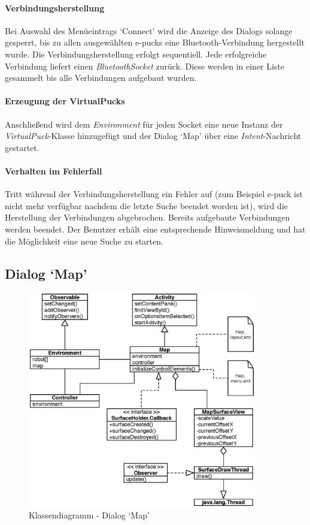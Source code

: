 \documentclass[10pt,a4paper]{article}
\begin{document}
	\paragraph*{Verbindungsherstellung}
	Bei Auswahl des Menüeintrags `Connect' wird die Anzeige des Dialogs solange gesperrt, bis zu allen ausgewählten e-pucks eine Bluetooth-Verbindung
	hergestellt wurde. Die Verbindungsherstellung erfolgt sequentiell. Jede erfolgreiche Verbindung liefert einen \textit{BluetoothSocket} zurück.
	Diese werden in einer Liste gesammelt bis alle Verbindungen aufgebaut wurden.
	
	\paragraph*{Erzeugung der VirtualPucks}
	Anschließend wird dem \textit{Environment} für jeden Socket eine neue Instanz der \textit{VirtualPuck}-Klasse hinzugefügt und der Dialog `Map' über
	eine \textit{Intent}-Nachricht gestartet.
	
	\paragraph*{Verhalten im Fehlerfall}
	Tritt während der Verbindungsherstellung ein Fehler auf (zum Beispiel e-puck ist nicht mehr verfügbar nachdem die letzte Suche beendet worden
	ist), wird die Herstellung der Verbindungen abgebrochen. Bereits aufgebaute Verbindungen werden beendet. Der Benutzer erhält eine entsprechende
	Hinweismeldung und hat die Möglichkeit eine neue Suche zu starten.
	
	\subsection*{Dialog `Map'}
	\label{subsec:dialog_map}
	
	\begin{figure}[h]
			\centering
			\includegraphics[width=10cm]{images/entwurf_map.eps}
  			\caption{Klassendiagramm - Dialog `Map'}
  			\label{fig:dialog_map}
  	\end{figure}
	
\end{document}
